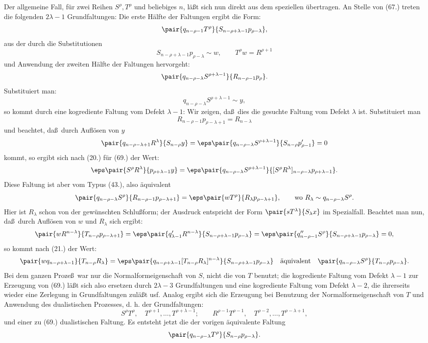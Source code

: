 Der allgemeine Fall, f\"ur zwei Reihen $S^\rho,T^\rho$ und beliebiges $n$, l\"a\ss t sich nun direkt aus dem speziellen \"ubertragen. An Stelle von (67.) treten die folgenden $2\lambda-1$ Grundfaltungen:
Die erste H\"alfte der Faltungen ergibt die Form:
\[
 \pair{q_{n-\rho-1}T^\rho}{S_{n-\rho+\lambda-1}p_{\rho-\lambda}},
\]
aus der durch die Substitutionen
\[
 S_{n-\rho+\lambda-1}p_{\rho-\lambda}\sim w,
 \qquad T^\rho w=R^{\rho+1}
\]
und Anwendung der zweiten H\"alfte der Faltungen hervorgeht:
\[
 \pair{q_{n-\rho-\lambda}S^{\rho+\lambda-1}}{R_{n-\rho-1}p_\rho}.
\]
Substituiert man:
\[
 q_{n-\rho-\lambda}S^{\rho+\lambda-1}\sim y,
\]
so kommt durch eine kogrediente Faltung vom Defekt $\lambda-1$:
Wir zeigen, da\ss\ dies die gesuchte Faltung vom Defekt $\lambda$ ist. Substituiert man
\[
 R_{n-\rho-1}p_{\rho-\lambda+1}=R_{n-\lambda}
\]
und beachtet, da\ss\ durch Aufl\"osen von $y$
\[
 \pair{q_{n-\rho-\lambda+1}R^\lambda}{S_{n-\rho}y}
 =\eps\pair{q_{n-\rho-\lambda}S^{\rho+\lambda-1}}{S_{n-\rho}p'_{\rho-1}}=0
\]
kommt, so ergibt sich nach (20.) f\"ur (69.) der Wert:
\[
 \eps\pair{S^\rho R^\lambda}{p_{\rho+\lambda-1}y}
 =\eps\pair{q_{n-\rho-\lambda}S^{\rho+\lambda-1}}{[S^\rho R^\lambda]_{n-\rho-\lambda}p_{\rho+\lambda-1}}.
\]
Diese Faltung ist aber vom Typus (43.), also \"aquivalent
\[
 \pair{q_{n-\rho-\lambda}S^\rho}{R_{n-\rho-1}p_{\rho-\lambda+1}}
 =\eps\pair{wT^\rho}{R_\lambda p_{\rho-\lambda+1}},
 \qquad \text{wo }R_\lambda\sim q_{n-\rho-\lambda}S^\rho.
\]
Hier ist $R_\lambda$ schon von der gew\"unschten Schlu\ss{}form; der Ausdruck entspricht der Form $\pair{sT^\lambda}{S_\lambda x}$ im Spezialfall. Beachtet man nun, da\ss\ durch Aufl\"osen von $w$ und $R_\lambda$ sich ergibt:
\[
 \pair{wR^{n-\lambda}}{T_{n-\rho}p_{\rho-\lambda+1}}
 =\eps\pair{q'_{\lambda-1}R^{n-\lambda}}{S_{n-\rho+\lambda-1}p_{\rho-\lambda}}
 =\eps\pair{q''_{n-\rho-1}S^\rho}{S_{n-\rho+\lambda-1}p_{\rho-\lambda}}=0,
\]
so kommt nach (21.) der Wert:
\[
 \pair{wq_{n-\rho+\lambda-1}}{T_{n-\rho}R_\lambda}
 =\eps\pair{q_{n-\rho+\lambda-1}[T_{n-\rho}R_\lambda]^{n-\lambda}}{S_{n-\rho+\lambda-1}p_{\rho-\lambda}}
 \quad\text{\"aquivalent}\quad
 \pair{q_{n-\rho-\lambda}S^\rho}{T_{n-\rho}p_{\rho-\lambda}}.
\]
Bei dem ganzen Proze\ss\ war nur die Normalformeigenschaft von $S$, nicht die von $T$ benutzt; die kogrediente Faltung vom Defekt $\lambda-1$ zur Erzeugung von (69.) l\"a\ss t sich also ersetzen durch $2\lambda-3$ Grundfaltungen und eine kogrediente Faltung vom Defekt $\lambda-2$, die ihrerseits wieder eine Zerlegung in Grundfaltungen zul\"a\ss t usf. Analog ergibt sich die Erzeugung bei Benutzung der Normalformeigenschaft von $T$ und Anwendung des dualistischen Prozesses, d. h. der Grundfaltungen:
\[
 S^\rho T^\rho,\quad T^{\rho+1},\ldots,T^{\rho+\lambda-1};
 \qquad R^{\rho-1}T^{\rho-1},\quad T^{\rho-2},\ldots,T^{\rho-\lambda+1},
\]
und einer zu (69.) dualistischen Faltung. Es entsteht jetzt die der vorigen \"aquivalente Faltung
\[
 \pair{q_{n-\rho-\lambda}T^\rho}{S_{n-\rho}p_{\rho-\lambda}}.
\]
